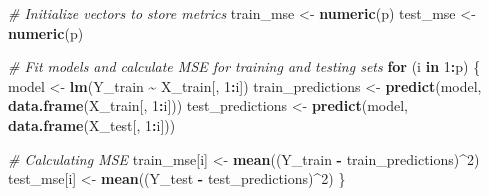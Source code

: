 \documentclass[
]{article}
\newenvironment{Shaded}{\begin{snugshade}}{\end{snugshade}}
\newcommand{\CommentTok}[1]{\textcolor[rgb]{0.56,0.35,0.01}{\textit{#1}}}
\newcommand{\ControlFlowTok}[1]{\textcolor[rgb]{0.13,0.29,0.53}{\textbf{#1}}}
\newcommand{\DecValTok}[1]{\textcolor[rgb]{0.00,0.00,0.81}{#1}}
\newcommand{\FunctionTok}[1]{\textcolor[rgb]{0.13,0.29,0.53}{\textbf{#1}}}
\newcommand{\NormalTok}[1]{#1}
\newcommand{\OtherTok}[1]{\textcolor[rgb]{0.56,0.35,0.01}{#1}}
\newcommand{\SpecialCharTok}[1]{\textcolor[rgb]{0.81,0.36,0.00}{\textbf{#1}}}
\begin{document}
\begin{Shaded}
\begin{Highlighting}[]
\CommentTok{\# Initialize vectors to store metrics}
\NormalTok{train\_mse }\OtherTok{\textless{}{-}} \FunctionTok{numeric}\NormalTok{(p)}
\NormalTok{test\_mse }\OtherTok{\textless{}{-}} \FunctionTok{numeric}\NormalTok{(p)}

\CommentTok{\# Fit models and calculate MSE for training and testing sets}
\ControlFlowTok{for}\NormalTok{ (i }\ControlFlowTok{in} \DecValTok{1}\SpecialCharTok{:}\NormalTok{p) \{}
\NormalTok{  model }\OtherTok{\textless{}{-}} \FunctionTok{lm}\NormalTok{(Y\_train }\SpecialCharTok{\textasciitilde{}}\NormalTok{ X\_train[, }\DecValTok{1}\SpecialCharTok{:}\NormalTok{i])}
\NormalTok{  train\_predictions }\OtherTok{\textless{}{-}} \FunctionTok{predict}\NormalTok{(model, }\FunctionTok{data.frame}\NormalTok{(X\_train[, }\DecValTok{1}\SpecialCharTok{:}\NormalTok{i]))}
\NormalTok{  test\_predictions }\OtherTok{\textless{}{-}} \FunctionTok{predict}\NormalTok{(model, }\FunctionTok{data.frame}\NormalTok{(X\_test[, }\DecValTok{1}\SpecialCharTok{:}\NormalTok{i]))}
  
  \CommentTok{\# Calculating MSE}
\NormalTok{  train\_mse[i] }\OtherTok{\textless{}{-}} \FunctionTok{mean}\NormalTok{((Y\_train }\SpecialCharTok{{-}}\NormalTok{ train\_predictions)}\SpecialCharTok{\^{}}\DecValTok{2}\NormalTok{)}
\NormalTok{  test\_mse[i] }\OtherTok{\textless{}{-}} \FunctionTok{mean}\NormalTok{((Y\_test }\SpecialCharTok{{-}}\NormalTok{ test\_predictions)}\SpecialCharTok{\^{}}\DecValTok{2}\NormalTok{)}
\NormalTok{\}}
\end{Highlighting}
\end{Shaded}
\end{document}
